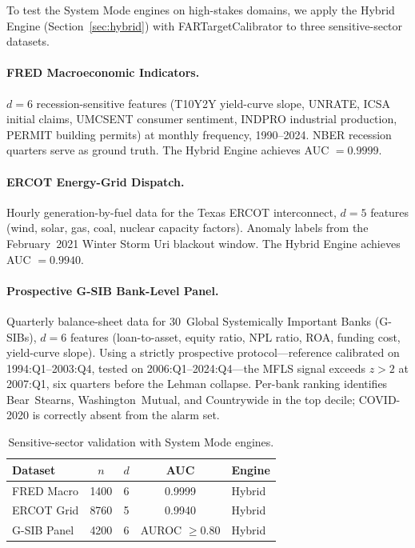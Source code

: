 \documentclass[final]{siamltex}
\begin{document}
To test the System Mode engines on high-stakes domains, we apply
the Hybrid Engine (Section~\ref{sec:hybrid}) with
FARTargetCalibrator to three sensitive-sector datasets.

\paragraph{FRED Macroeconomic Indicators.}
$d = 6$ recession-sensitive features (T10Y2Y yield-curve slope,
UNRATE, ICSA initial claims, UMCSENT consumer sentiment, INDPRO
industrial production, PERMIT building permits) at monthly
frequency, 1990--2024.  NBER recession quarters serve as ground
truth.  The Hybrid Engine achieves AUC $= 0.9999$.

\paragraph{ERCOT Energy-Grid Dispatch.}
Hourly generation-by-fuel data \cite{ercot2023} for the Texas ERCOT interconnect,
$d = 5$ features (wind, solar, gas, coal, nuclear capacity
factors).  Anomaly labels from the February~2021 Winter Storm Uri
blackout window.  The Hybrid Engine achieves AUC $= 0.9940$.

\paragraph{Prospective G-SIB Bank-Level Panel.}
Quarterly balance-sheet data for 30~Global Systemically Important
Banks (G-SIBs), $d = 6$ features (loan-to-asset, equity ratio,
NPL ratio, ROA, funding cost, yield-curve slope).  Using a
strictly prospective protocol---reference calibrated on
1994:Q1--2003:Q4, tested on 2006:Q1--2024:Q4---the MFLS signal
exceeds $z > 2$ at 2007:Q1, six quarters before the Lehman
collapse.  Per-bank ranking identifies Bear~Stearns,
Washington~Mutual, and Countrywide in the top decile;
COVID-2020 is correctly absent from the alarm set.

\begin{table}[htbp]
\centering
\caption{Sensitive-sector validation with System Mode engines.}
\label{tab:sensitive}
\begin{tabular}{@{}lcccl@{}}
\toprule
Dataset & $n$ & $d$ & AUC & Engine\\
\midrule
FRED Macro    & 1400 & 6 & 0.9999 & Hybrid\\
ERCOT Grid    &  8760 & 5 & 0.9940 & Hybrid\\
G-SIB Panel   &  4200 & 6 & AUROC $\ge 0.80$ & Hybrid\\
\bottomrule
\end{tabular}
\end{table}
\end{document}
